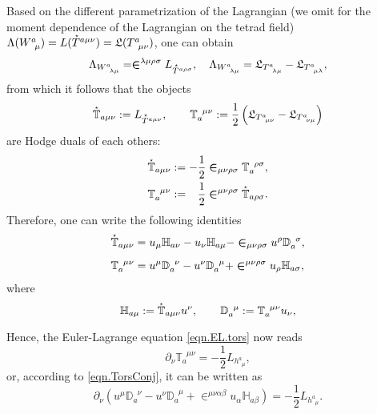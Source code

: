 \documentclass[
10pt, %
a4paper, %
oneside, %
twocolumn,
headinclude,footinclude, %
BCOR5mm, %
]{scrartcl}
\newcommand{\pd}[1]{\partial_{#1}}
\newcommand{\tetrsymbol}{h}
\newcommand{\tetr}[2]{\tetrsymbol^{#1}_{\phantom{#1}#2}}
\newcommand{\D}[1]{\partial_{#1}} %
\newcommand{\Tors}[2]{T^{#1}_{\phantom{#1}#2}}
\newcommand{\w}[2]{W^{#1}_{\phantom{#1}#2}}
\newcommand{\Lag}{\Lambda}	%
\newcommand{\Laghodge}{L}%
\newcommand{\Lagtors}{\mathfrak{L}}%
\newcommand{\LCsymb}{\bm{\in}}    %
\newcommand{\HDT}[1]{\accentset{\star}{T}^{#1}}
\newcommand{\TorsConj}[2]{\mathbb{T}_{#1}^{\phantom{#1}#2}}
\newcommand{\HTConj}[1]{\accentset{\star}{\mathbb{T}}_{#1}}
\newcommand{\Dbb}[2]{\mathbb{D}_{#1}^{\phantom{#1}#2}}
\newcommand{\Hbb}[2]{\mathbb{H}_{#1#2}}
\begin{document}
	Based on the different parametrization of the Lagrangian (we omit for the moment dependence of 
	the 
	Lagrangian on the tetrad field) $ \Lag(\w{a}{\mu}) = 
	\Laghodge(\HDT{a\mu\nu}) = \Lagtors(\Tors{a}{\mu\nu}) $, one can obtain
	\begin{equation}\label{eqn.Lambda_W.Hodge}
		\Lag_{\w{a}{\lambda\mu}} = \LCsymb^{\lambda\mu\rho\sigma} \Laghodge_{\HDT{a\rho\sigma}},
		\quad
		\Lag_{\w{a}{\lambda\mu}} = \Lagtors_{\Tors{a}{\lambda\mu}} - 
		\Lagtors_{\Tors{a}{\mu\lambda}},
	\end{equation}
	from which it follows that the objects
	\begin{equation}
		\HTConj{a\mu\nu} := \Laghodge_{\HDT{a\mu\nu}}, 
		\qquad
		\TorsConj{a}{\mu\nu} := \frac12 \left( \Lagtors_{\Tors{a}{\mu\nu}} - 
		\Lagtors_{\Tors{a}{\nu\mu}} 
		\right)
	\end{equation}
	are Hodge duals of each others:
	\begin{subequations}
		\begin{align}
			\HTConj{a\mu\nu} &:=-\frac12\LCsymb_{\mu\nu\rho\sigma}\TorsConj{a}{\rho\sigma}, 
			\\
			\TorsConj{a}{\mu\nu} &:= \phantom{+}\frac12 
			\LCsymb^{\mu\nu\rho\sigma}\HTConj{a\rho\sigma}.
		\end{align}
	\end{subequations}
	Therefore, one can write the following identities
	\begin{subequations}
		\begin{align}
			\HTConj{a\mu\nu} &= u_\mu \Hbb{a}{\nu} - u_\nu \Hbb{a}{\mu} - 
			\LCsymb_{\mu\nu\rho\sigma}u^\rho \Dbb{a}{\sigma}\label{app.eqn.Deqn1},\\[2mm]
			\TorsConj{a}{\mu\nu} &= u^\mu \Dbb{a}{\nu} - u^\nu \Dbb{a}{\mu} +
			\LCsymb^{\mu\nu\rho\sigma}u_\rho \Hbb{a}{\sigma},\label{eqn.TorsConj}
		\end{align}
	\end{subequations}
	where 
	\begin{equation}\label{app.eqn.DH}
		\Hbb{a}{\mu} := \HTConj{a\mu\nu}u^\nu, 
		\qquad
		\Dbb{a}{\mu} := \TorsConj{a}{\mu\nu}u_\nu,
	\end{equation}
	
	Hence, the Euler-Lagrange equation \eqref{eqn.EL.tors} now reads
	\begin{equation}%
		\pd{\nu} \TorsConj{a}{\mu\nu} =-\frac12 \Laghodge_{\tetr{a}{\mu}},
	\end{equation}
	or, according to \eqref{eqn.TorsConj}, it can be written as
	\begin{equation}\label{app.eqn.Deqn2}
		\D{\nu}(u^\mu \Dbb{a}{\nu} - u^\nu \Dbb{a}{\mu} + \LCsymb^{\mu\nu\alpha\beta}
		u_\alpha\Hbb{a}{\beta}) = -\frac12 \Laghodge_{\tetr{a}{\mu}}.
	\end{equation}
	
\end{document}
